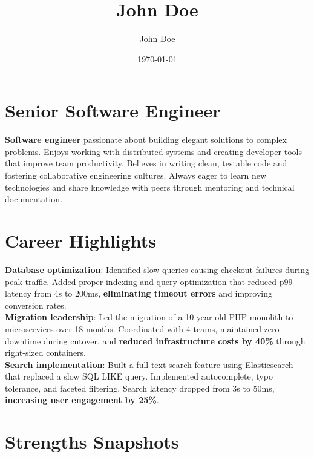 \documentclass{custom}
\author{John Doe}
\date{\today}
\title{John Doe}
\begin{document}
\maketitle
\heading
{}
\section{Senior Software Engineer}
\label{introduction}
\introduction

\textbf{Software engineer} passionate about building elegant solutions to complex
problems. Enjoys working with distributed systems and creating developer tools
that improve team productivity. Believes in writing clean, testable code and
fostering collaborative engineering cultures. Always eager to learn new
technologies and share knowledge with peers through mentoring and technical
documentation.
\section{Career Highlights}
\label{career-highlights}
\textbf{Database optimization}: Identified slow queries causing checkout failures during peak traffic. Added
proper indexing and query optimization that reduced p99 latency from 4s to
200ms, \textbf{eliminating timeout errors} and improving conversion rates.
\\[0.2\baselineskip]
\textbf{Migration leadership}: Led the migration of a 10-year-old PHP monolith to microservices over 18 months.
Coordinated with 4 teams, maintained zero downtime during cutover, and
\textbf{reduced infrastructure costs by 40\%} through right-sized containers.
\\[0.2\baselineskip]
\textbf{Search implementation}: Built a full-text search feature using Elasticsearch that replaced a slow SQL
LIKE query. Implemented autocomplete, typo tolerance, and faceted filtering.
Search latency dropped from 3s to 50ms, \textbf{increasing user engagement by 25\%}.
\\[0.2\baselineskip]
\section{Strengths Snapshots}
\label{strengths-snapshots}
\end{document}
